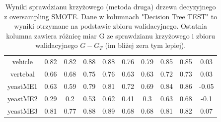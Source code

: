 \begin{table}[H]
\begin{center}
{\begin{tabular}{|c|c|c|c|c|c|c|c|c|c|}
			vehicle&0.82&0.82&0.88&0.88&0.76&0.79&0.85&0.85&0.03\\%
			vertebal&0.66&0.68&0.75&0.76&0.63&0.63&0.72&0.73&0.03\\%
			yeastME1&0.63&0.59&0.79&0.81&0.72&0.69&0.84&0.86&{-}0.05\\%
			yeastME2&0.29&0.2&0.53&0.62&0.41&0.3&0.63&0.68&{-}0.1\\%
			yeastME3&0.81&0.77&0.88&0.89&0.68&0.68&0.81&0.82&0.07\\%
			\hline%
		\end{tabular}}%
			\caption{Wyniki sprawdzianu krzyżowego (metoda druga) drzewa decyzyjnego z oversampling SMOTE. Dane w kolumnach "Decision Tree TEST" to wyniki otrzymane na podstawie zbioru walidacyjnego. Ostatnia kolumna zawiera różnicę  miar G ze sprawdzianu krzyżowego i zbioru walidacyjnego $G-G_T$ (im bliżej zera tym lepiej).}
			\label{CVoversampling2}
	\end{center}
\end{table}